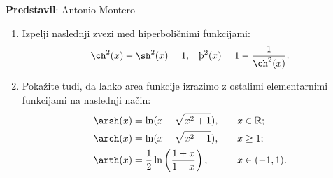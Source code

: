 \textbf{Predstavil}: Antonio Montero

\begin{enumerate}
\item Izpelji naslednji zvezi med hiperboličnimi funkcijami:
\begin{align*}
  \ch^2 (x) - \sh^2 (x) = 1, &&\th^2 (x) = 1 - \frac{1}{\ch^{2}(x)}.
\end{align*}

\item Pokažite tudi, da lahko area funkcije izrazimo z ostalimi elementarnimi funkcijami na naslednji način:
\begin{align*}
\arsh(x) &= \ln (x + \sqrt{x^{2}+1}), &\quad  x &\in \mathbb{R}; \\ 
\arch(x) &= \ln (x + \sqrt{x^{2}-1}), &  x &\geq 1; \\
\arth(x) &= \frac{1}{2}\ln \left( \frac{1+x}{1-x}\right),& x &\in (-1,1).
\end{align*}

\end{enumerate}